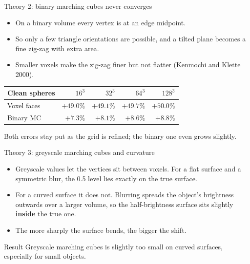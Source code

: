\documentclass[aspectratio=169,11pt]{beamer}
\begin{document}
\begin{frame}{Theory 2: binary marching cubes never converges}
  \begin{itemize}
    \item On a binary volume every vertex is at an edge midpoint.
    \item So only a few triangle orientations are possible, and a tilted plane becomes a fine
          zig-zag with extra area.
    \item Smaller voxels make the zig-zag finer but not flatter (Kenmochi and Klette 2000).
  \end{itemize}
  \vspace{0.5em}
  \centering
  \begin{tabular}{lrrrr}
    \toprule
    Clean spheres & $16^3$ & $32^3$ & $64^3$ & $128^3$ \\
    \midrule
    Voxel faces & $+49.0\%$ & $+49.1\%$ & $+49.7\%$ & $+50.0\%$ \\
    Binary MC & $+7.3\%$ & $+8.1\%$ & $+8.6\%$ & $+8.8\%$ \\
    \bottomrule
  \end{tabular}
  \vspace{0.3em}

  Both errors stay put as the grid is refined; the binary one even grows slightly.
\end{frame}

\begin{frame}{Theory 3: greyscale marching cubes and curvature}
  \begin{itemize}
    \item Greyscale values let the vertices sit between voxels. For a flat surface and a symmetric
          blur, the 0.5 level lies exactly on the true surface.
    \item For a curved surface it does not. Blurring spreads the object's brightness outwards
          over a larger volume, so the half-brightness surface sits slightly \textbf{inside} the
          true one.
    \item The more sharply the surface bends, the bigger the shift.
  \end{itemize}
  \vspace{0.5em}
  \begin{alertblock}{Result}
    Greyscale marching cubes is slightly too small on curved surfaces, especially for small objects.
  \end{alertblock}
\end{frame}
\end{document}
